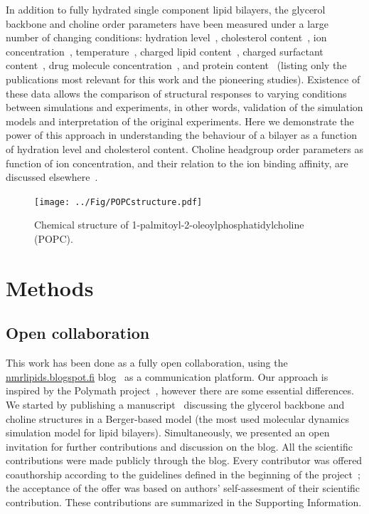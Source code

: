 \documentclass[journal=jpcbfk,manuscript=article]{achemso}
\begin{document}
In addition to fully hydrated single component lipid bilayers, the glycerol backbone and choline order parameters
have been measured under a large number of changing conditions: hydration level~\cite{bechinger91,ulrich94,dvinskikh05b}, cholesterol content~\cite{brown78,ferreira13},
ion concentration~\cite{brown77,akutsu81,altenbach84,roux90,roux91}, temperature~\cite{gally75}, charged lipid content~\cite{roux90,roux91}, charged surfactant content~\cite{scherer89}, 
drug molecule concentration~\cite{browning82,kelusky84,castro08}, and protein content~\cite{roux89,kuchinka89} (listing only the publications most relevant for this work and the pioneering studies).
Existence of these data allows the comparison of structural responses to varying conditions between simulations and experiments,
in other words, validation of the simulation models and interpretation of the original experiments. 
Here we demonstrate the power of this approach in understanding the behaviour of a bilayer as a function of hydration level and cholesterol content.
Choline headgroup order parameters as function of ion concentration, and their relation to the ion binding affinity, are discussed elsewhere~\cite{ionpaper}.

  \begin{figure}[]
  \centering
  \texttt{[image: ../Fig/POPCstructure.pdf]}

  \caption{\label{POPCstructure}
    Chemical structure of  1-palmitoyl-2-oleoylphosphatidylcholine (POPC).}
  
\end{figure}

\section{Methods}

\subsection{Open collaboration}

This work has been done as a fully open collaboration, using the \url{nmrlipids.blogspot.fi} blog~\cite{nmrlipids}
as a communication platform.
Our approach is inspired by the Polymath project~\cite{gowers09}, however there are some essential differences. 
We started by publishing a manuscript~\cite{ollila13} discussing the glycerol backbone and choline structures 
in a Berger-based model (the most used molecular dynamics simulation model for lipid bilayers).
Simultaneously,  we presented an open invitation for further contributions and discussion on the blog.
All the scientific contributions were made publicly through the blog. Every contributor was offered coauthorship
according to the guidelines defined in the beginning of the project~\cite{creditsPOST};
the acceptance of the offer was based on authors' self-assesment of their scientific contribution.
These contributions are summarized in the Supporting Information. 
\end{document}
